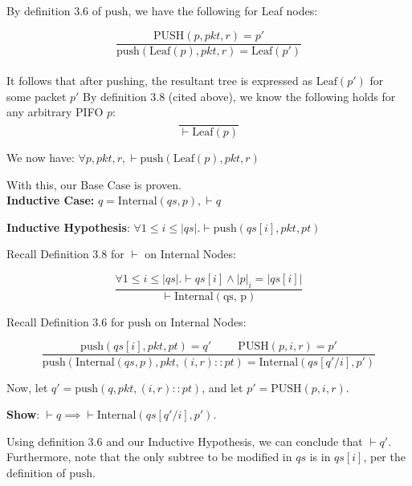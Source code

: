 \documentclass{article}
\begin{document}
\noindent By definition 3.6 of $\text{push}$, we have the following for Leaf nodes:

$$\frac{\text{PUSH}(p, pkt, r) = p'}{\text{push}(\text{Leaf}(p), pkt, r) = \text{Leaf}(p')}$$\\[-10pt]

\noindent It follows that after pushing, the resultant tree is expressed as $\text{Leaf}(p')$ for some packet $p'$ By definition 3.8 (cited above), we know the following holds for any arbitrary PIFO $p$:\\[-10pt]

$$\frac{}{\vdash \text{Leaf}(p)}$$

\noindent We now have: $\forall p, pkt, r, \vdash \text{push}(\text{Leaf}(p), pkt, r)$\newline

\noindent With this, our Base Case is proven.\\[10pt]

\noindent \textbf{Inductive Case:} $q = \text{Internal}(qs, p), \vdash q$\newline

\noindent \textbf{Inductive Hypothesis}: $\forall 1 \leq i \leq |qs|. \vdash \text{push}(qs[i], pkt, pt)$\newline

\noindent Recall Definition 3.8 for $\vdash$ on Internal Nodes:

$$\frac{\forall 1 \leq i \leq |qs|. \vdash qs[i] \land |p|_i = |qs[i]|}{\vdash \text{Internal}(\text{qs, p})}$$\newline

\noindent Recall Definition 3.6 for $\text{push}$ on Internal Nodes:

$$\frac{\text{push}(qs[i], pkt, pt) = q' \hspace{1cm} \text{PUSH}(p, i, r) = p'}{\text{push}(\text{Internal}(qs, p), pkt, (i, r) :: pt) = \text{Internal}(qs[q'/i], p')}$$\newline

\noindent Now, let $q' = \text{push}(q, pkt, (i, r) :: pt)$, and let $p' = \text{PUSH}(p, i, r)$.\newline

\noindent \textbf{Show}: $\vdash q \implies \vdash \text{Internal}(qs[q'/i], p')$.\newline

\noindent Using definition 3.6 and our Inductive Hypothesis, we can conclude that $\vdash q'$. Furthermore, note that the only subtree to be modified in $qs$ is in $qs[i]$, per the definition of $\text{push}$.\newline
\end{document}
